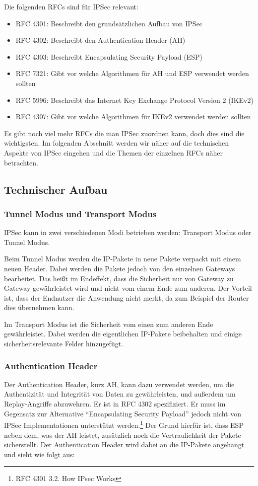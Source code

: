 \documentclass[12pt]{scrartcl}
\begin{document}
Die folgenden RFCs sind für IPSec relevant:
\begin{itemize}
\item RFC 4301: Beschreibt den grundsätzlichen Aufbau von IPSec\cite{RFC4301}
\item RFC 4302: Beschreibt den Authentication Header (AH)\cite{RFC4302}
\item RFC 4303: Beschreibt Encapsulating Security Payload (ESP)\cite{RFC4303}
\item RFC 7321: Gibt vor welche Algorithmen für AH und ESP verwendet werden sollten\cite{RFC7321}
\item RFC 5996: Beschreibt das Internet Key Exchange Protocol Version 2 (IKEv2)\cite{RFC5996}
\item RFC 4307: Gibt vor welche Algorithmen für IKEv2 verwendet werden sollten\cite{RFC4307}
\end{itemize}
Es gibt noch viel mehr RFCs die man IPSec zuordnen kann, doch dies sind die wichtigsten. Im folgenden Abschnitt werden wir näher auf die technischen Aspekte von IPSec eingehen und die Themen der einzelnen RFCs näher betrachten.

\subsection{Technischer Aufbau}
\subsubsection{Tunnel Modus und Transport Modus}
IPSec kann in zwei verschiedenen Modi betrieben werden: Transport Modus oder Tunnel Modus. \cite{RFC4301}

Beim Tunnel Modus werden die IP-Pakete in neue Pakete verpackt mit einem neuen Header. Dabei werden die Pakete jedoch von den einzelnen Gateways bearbeitet. Das heißt im Endeffekt, dass die Sicherheit nur von Gateway zu Gateway gewährleistet wird und nicht vom einem Ende zum anderen. Der Vorteil ist, dass der Endnutzer die Anwendung nicht merkt, da zum Beispiel der Router dies übernehmen kann. 

Im Transport Modus ist die Sicherheit vom einen zum anderen Ende gewährleistet. Dabei werden die eigentlichen IP-Pakete beibehalten und einige sicherheitsrelevante Felder hinzugefügt.

\subsubsection{Authentication Header}
Der Authentication Header, kurz AH, kann dazu verwendet werden, um die Authentizität und Integrität von Daten zu gewährleisten, und außerdem um Replay-Angriffe abzuwehren. Er ist in RFC 4302 spezifiziert.\cite{RFC4302} Er muss im Gegensatz zur Alternative "`Encapsulating Security Payload"' jedoch nicht von IPSec Implementationen unterstützt werden.\footnote{RFC 4301 3.2.  How IPsec Works} Der Grund hierfür ist, dass ESP neben dem, was der AH leistet, zusätzlich noch die Vertraulichkeit der Pakete sicherstellt. Der Authentication Header wird dabei an die IP-Pakete angehängt und sieht wie folgt aus:
\end{document}
